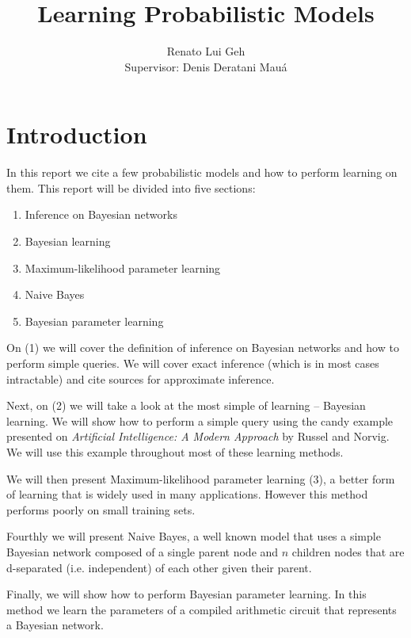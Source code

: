 \documentclass[a4paper,10pt]{article}
\title{\textbf{Learning Probabilistic Models}}
\theoremstyle{plain}
\begin{document}
\date{}
\author{
Renato Lui Geh \\
Supervisor: Denis Deratani Mauá
}
\vspace*{-40pt}
{\let\newpage\relax\maketitle}

\section{Introduction}

In this report we cite a few probabilistic models and how to perform learning on them. This report
will be divided into five sections:

\begin{enumerate}
  \item Inference on Bayesian networks
  \item Bayesian learning
  \item Maximum-likelihood parameter learning
  \item Naive Bayes
  \item Bayesian parameter learning
\end{enumerate}

On (1) we will cover the definition of inference on Bayesian networks and how to perform simple
queries. We will cover exact inference (which is in most cases intractable) and cite sources for
approximate inference.

Next, on (2) we will take a look at the most simple of learning -- Bayesian learning. We will show
how to perform a simple query using the candy example presented on \textit{Artificial Intelligence:
A Modern Approach}\cite{aima} by Russel and Norvig. We will use this example throughout most of
these learning methods.

We will then present Maximum-likelihood parameter learning (3), a better form of learning that is
widely used in many applications. However this method performs poorly on small training sets.

Fourthly we will present Naive Bayes, a well known model that uses a simple Bayesian network
composed of a single parent node and $n$ children nodes that are d-separated (i.e. independent) of
each other given their parent.

Finally, we will show how to perform Bayesian parameter learning. In this method we learn the
parameters of a compiled arithmetic circuit that represents a Bayesian network.
\end{document}

